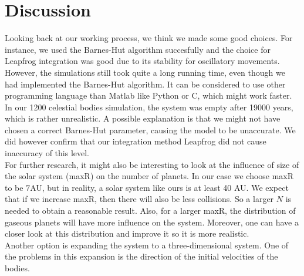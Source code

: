 \section{Discussion}
Looking back at our working process, we think we made some good choices.
For instance, we used the Barnes-Hut algorithm succesfully and the choice for Leapfrog integration was good due to its stability for oscillatory movements.\\

However, the simulations still took quite a long running time, even though we had implemented the Barnes-Hut algorithm. It can be considered to use other programming language than Matlab like Python or C, which might work faster.\\

In our 1200 celestial bodies simulation, the system was empty after 19000 years, which is rather unrealistic. A possible explanation is that we might not have chosen a correct Barnes-Hut parameter, causing the model to be unaccurate. We did however confirm that our integration method Leapfrog did not cause inaccuracy of this level.\\

For further research, it might also be interesting to look at the influence of size of the solar system (maxR) on the number of planets. In our case we choose maxR to be $7$AU, but in reality, a solar system like ours is at least 40 AU. We expect that if we increase maxR, then there will also be less collisions. So a larger $N$ is needed to obtain a reasonable result. Also, for a larger maxR, the distribution of gaseous planets will have more influence on the system. Moreover, one can have a closer look at this distribution and improve it so it is more realistic.\\

Another option is expanding the system to a three-dimensional system.
One of the problems in this expansion is the direction of the initial velocities of the bodies.



